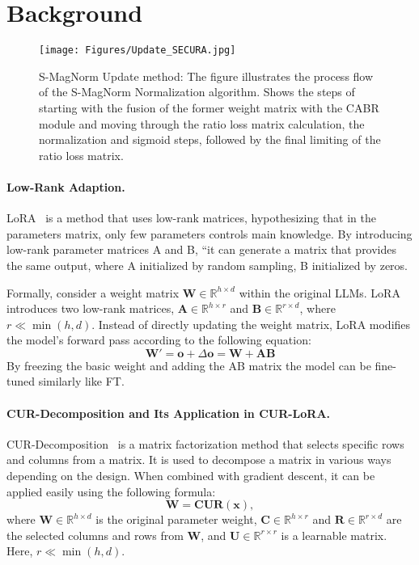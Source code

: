 \section{Background}

\begin{figure*}[tb]
    \centering
    \texttt{[image: Figures/Update\_SECURA.jpg]}
    \caption{S-MagNorm Update method: The figure illustrates the process flow of the S-MagNorm Normalization algorithm. Shows the steps of starting with the fusion of the former weight matrix with the CABR module and moving through the ratio loss matrix calculation, the normalization and sigmoid steps, followed by the final limiting of the ratio loss matrix.}
    \label{fig:S-MagNorm_Update}
    \vspace{-1em}
\end{figure*}


\paragraph{Low-Rank Adaption.}LoRA~\citep {whitehouse-etal-2024-low} is a method that uses low-rank matrices, hypothesizing that in the parameters matrix, only few parameters controls main knowledge. By introducing low-rank parameter matrices A and B, “it can generate a matrix that provides the same output, where A initialized by random sampling, B initialized by zeros.

Formally, consider a weight matrix \( \boldsymbol{W} \in \mathbb{R}^{h \times d} \) within the original LLMs. LoRA introduces two low-rank matrices, \( \boldsymbol{A} \in \mathbb{R}^{h \times r} \) and \( \boldsymbol{B} \in \mathbb{R}^{r \times d} \), where \( r \ll \min(h, d) \). Instead of directly updating the weight matrix, LoRA modifies the model's forward pass according to the following equation:
\[
    \boldsymbol{W}' = \boldsymbol{o} + \Delta \boldsymbol{o} = \boldsymbol{W} + \boldsymbol{AB}
\]
By freezing the basic weight and adding the AB matrix the model can be fine-tuned similarly like FT. 

\paragraph{CUR-Decomposition and Its Application in CUR-LoRA.}
CUR-Decomposition~\citep{hamm2019curdecompositionsapproximationsperturbations} is a matrix factorization method that selects specific rows and columns from a matrix. It is used to decompose a matrix in various ways depending on the design. When combined with gradient descent, it can be applied easily using the following formula:
\[
    \boldsymbol{W} = \boldsymbol{C} \boldsymbol{U} \boldsymbol{R}(\boldsymbol{x}),
\]
where \( \boldsymbol{W} \in \mathbb{R}^{h \times d} \) is the original parameter weight, \( \boldsymbol{C} \in \mathbb{R}^{h \times r} \) and \( \boldsymbol{R} \in \mathbb{R}^{r \times d} \) are the selected columns and rows from \( \boldsymbol{W} \), and \( \boldsymbol{U} \in \mathbb{R}^{r \times r} \) is a learnable matrix. Here, \( r \ll \min(h, d) \).

